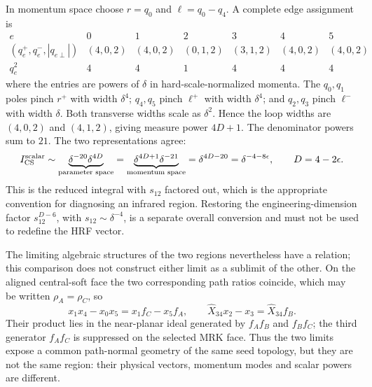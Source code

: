 \documentclass[a4paper,11pt]{article}
\begin{document}
In momentum space choose \(r=q_0\) and \(\ell=q_0-q_4\).  A complete edge
assignment is
\begin{equation}
\begin{array}{c|cccccc}
e&0&1&2&3&4&5\\ \hline
(q_e^+,q_e^-,|q_{e\perp}|)&
(4,0,2)&(4,0,2)&(0,1,2)&(3,1,2)&(4,0,2)&(4,0,2)\\
q_e^2&4&4&1&4&4&4
\end{array}
\label{eq:five-central-soft-edge-powers}
\end{equation}
where the entries are powers of \(\delta\) in hard-scale-normalized
momenta.  The \(q_0,q_1\) poles pinch \(r^+\) with width \(\delta^4\);
\(q_4,q_5\) pinch \(\ell^+\) with width \(\delta^4\); and \(q_2,q_3\)
pinch \(\ell^-\) with width \(\delta\).  Both transverse widths scale as
\(\delta^2\).  Hence the loop widths are \((4,0,2)\) and \((4,1,2)\),
giving measure power \(4D+1\).  The denominator powers sum to \(21\).
The two representations agree:
\begin{equation}
 I_{\rm CS}^{\rm scalar}\sim
 \underbrace{\delta^{-20}\delta^{4D}}_{\text{parameter space}}
 =\underbrace{\delta^{4D+1}\delta^{-21}}_{\text{momentum space}}
 =\delta^{4D-20}
 =\delta^{-4-8\epsilon},\qquad D=4-2\epsilon.
 \label{eq:five-central-soft-power}
\end{equation}
This is the reduced integral with \(s_{12}\) factored out, which is the
appropriate convention for diagnosing an infrared region.  Restoring the
engineering-dimension factor \(s_{12}^{D-6}\), with
\(s_{12}\sim\delta^{-4}\), is a separate overall conversion and must not be
used to redefine the HRF vector.

The limiting algebraic structures of the two regions nevertheless have a
relation; this comparison does not construct either limit as a sublimit of
the other.  On the aligned central-soft face the two corresponding path
ratios coincide, which may be written \(\rho_A=\rho_C\), so
\begin{equation}
 x_1x_4-x_0x_5=x_1f_C-x_5f_A,\qquad
 \widehat X_{34}x_2-x_3=\widehat X_{34}f_B.
 \label{eq:five-region-ideal-relation-clean}
\end{equation}
Their product lies in the near-planar ideal generated by \(f_Af_B\) and
\(f_Bf_C\); the third generator \(f_Af_C\) is suppressed on the selected
MRK face.  Thus the two limits expose a common path-normal geometry of the
same seed topology, but they are not the same region: their physical vectors,
momentum modes and scalar powers are different.
\end{document}

